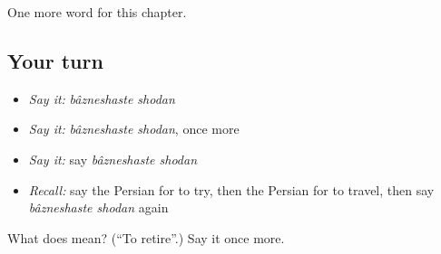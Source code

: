 \begin{grammarlens}[title={What you've built}]
One more word for this chapter.
\end{grammarlens}

\subsection*{Your turn}
\begin{itemize}
\raggedright
  \item \emph{Say it:} \emph{bâzneshaste shodan}
  \item \emph{Say it:} \emph{bâzneshaste shodan}, once more
  \item \emph{Say it:} say \emph{bâzneshaste shodan}
  \item \emph{Recall:} say the Persian for to try, then the Persian for to travel, then say \emph{bâzneshaste shodan} again
\end{itemize}

\begin{tcolorbox}[breakable,colback=teal!4,colframe=teal!35!black,title={Before you move on}]
What does   mean? (\textquotedblleft{}To retire\textquotedblright{}.) Say it once more.
\end{tcolorbox}
